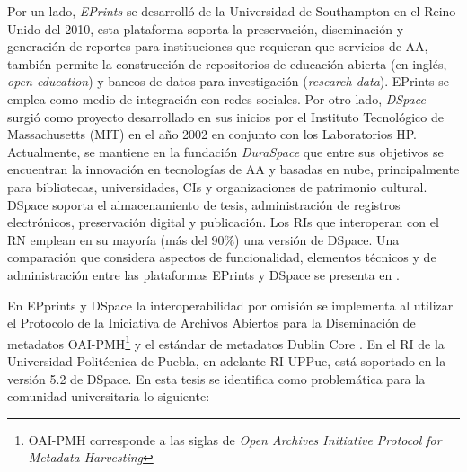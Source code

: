 Por un lado, \textit{EPrints} \cite{EPrints} se desarroll\'o de la Universidad de Southampton en el Reino Unido del 2010, esta plataforma soporta la preservaci\'on, diseminaci\'on y generaci\'on de reportes para instituciones que requieran que servicios de AA, tambi\'en permite la cons\-truc\-ci\'on de repositorios de educaci\'on abierta (en ingl\'es, \textit{open education}) y bancos de datos para investigaci\'on (\textit{research data}). EPrints se emplea como medio de integraci\'on con redes sociales. Por otro lado, \textit{DSpace} \cite{DSpaceRef} surgi\'o como proyecto desarrollado en sus inicios por el Instituto Tecnol\'ogico de Massachusetts (MIT) en el a\~{n}o 2002 en conjunto con los Laboratorios HP. Actualmente, se mantiene en la fundaci\'on \textit{DuraSpace} que entre sus objetivos se encuentran la innovaci\'on en tecnolog\'ias de AA y basadas en nube, principalmente para bibliotecas, universidades, CIs y organizaciones de patrimonio cultural. DSpace soporta el almacenamiento de tesis, administraci\'on de registros electr\'onicos, preservaci\'on digital y publicaci\'on. Los RIs que interoperan con el RN \cite{RepositorioNacional} emplean en su mayor\'ia (m\'as del 90\%) una versi\'on de DSpace.  Una comparaci\'on que considera aspectos de funcionalidad, elementos t\'ecnicos y de administraci\'on entre las plataformas EPrints y DSpace se presenta en \cite{EvaluacionDeUsabilidad}.\newline

En EPprints y DSpace la interoperabilidad por omisi\'on se implementa al utilizar el Protocolo de la Iniciativa de Archivos Abiertos para la Diseminaci\'on de metadatos OAI-PMH\footnote{OAI-PMH corresponde a las siglas de \textit{Open Archives Initiative Protocol for Metadata Harvesting}} \cite{Lagoze2005} y el est\'andar de metadatos Dublin Core \cite{DublinCore}. En el RI de la Universidad Polit\'ecnica de Puebla, en adelante RI-UPPue, est\'a soportado en la versi\'on 5.2 de DSpace. En esta tesis se identifica como problem\'atica para la comunidad universitaria lo siguiente:

